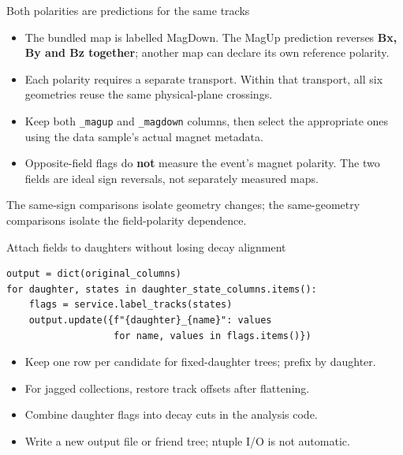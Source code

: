 \documentclass[aspectratio=169,11pt]{beamer}
\begin{document}
\begin{frame}{Both polarities are predictions for the same tracks}
\begin{itemize}
\item The bundled map is labelled MagDown. The MagUp prediction reverses
\textbf{Bx, By and Bz together}; another map can declare its own reference polarity.
\item Each polarity requires a separate transport. Within that transport,
all six geometries reuse the same physical-plane crossings.
\item Keep both \texttt{\_magup} and \texttt{\_magdown} columns, then select the
appropriate ones using the data sample's actual magnet metadata.
\item Opposite-field flags do \textbf{not} measure the event's magnet polarity.
The two fields are ideal sign reversals, not separately measured maps.
\end{itemize}
\vspace{3mm}The same-sign comparisons isolate geometry changes; the same-geometry
comparisons isolate the field-polarity dependence.
\end{frame}

\begin{frame}[fragile]{Attach fields to daughters without losing decay alignment}
\small
\begin{verbatim}
output = dict(original_columns)
for daughter, states in daughter_state_columns.items():
    flags = service.label_tracks(states)
    output.update({f"{daughter}_{name}": values
                   for name, values in flags.items()})
\end{verbatim}
\normalsize
\begin{itemize}
\item Keep one row per candidate for fixed-daughter trees; prefix by daughter.
\item For jagged collections, restore track offsets after flattening.
\item Combine daughter flags into decay cuts in the analysis code.
\item Write a new output file or friend tree; ntuple I/O is not automatic.
\end{itemize}
\end{frame}
\end{document}
